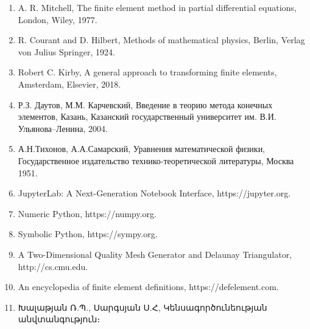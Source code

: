 \documentclass[fleqn, bachelor,subf,12pt,notitlepage]{article}
\begin{document}
\begin{enumerate}[leftmargin=0.5cm]
\item {A. R. Mitchell}, The finite element method in partial differential equations, London, Wiley, 1977.
\item {{R. Courant and D. Hilbert},} Methods of mathematical physics, Berlin, Verlag von Julius Springer, 1924.
\item{Robert C. Kirby}, A general approach to transforming finite elements, Amsterdam, Elsevier, 2018.
\item{Р.З. Даутов, М.М. Карчевский}, Введение в теорию метода конечных элементов, Казань, Казанский государственный университет
им. В.И. Ульянова–Ленина, 2004.
\item{А.Н.Тихонов, А.А.Самарский}, Уравнения математической физики, Государственное издательство технико-теоретической литературы, Москва 1951.
\item{JupyterLab: A Next-Generation Notebook Interface}, https://jupyter.org.
\item{Numeric Python}, https://numpy.org.
\item{Symbolic Python}, https://sympy.org.
\item{A Two-Dimensional Quality Mesh Generator and Delaunay Triangulator}, http://cs.cmu.edu.
\item{An encyclopedia of finite element definitions}, https://defelement.com.
\item{Խալաթյան Ռ.Պ., Սարգսյան Ս.Հ}, Կենսագործունեության անվտանգություն։

\end{enumerate}
\end{document}
